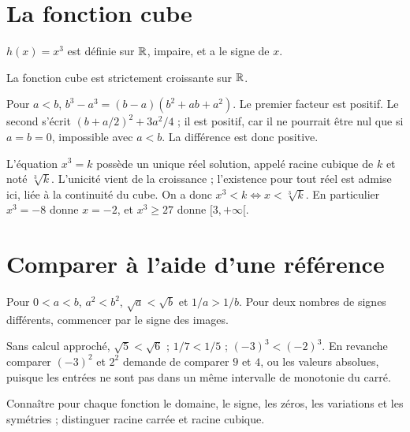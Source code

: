 \documentclass[../cours_2de.tex]{subfiles}
\begin{document}
\section{La fonction cube}
$h(x)=x^3$ est définie sur $\mathbb{R}$, impaire, et a le signe de $x$.
\begin{theoreme}
La fonction cube est strictement croissante sur $\mathbb{R}$.
\end{theoreme}
\begin{demonstration}
Pour $a<b$,
$b^3-a^3=(b-a)(b^2+ab+a^2)$.
Le premier facteur est positif. Le second s'écrit
$(b+a/2)^2+3a^2/4$ ; il est positif, car il ne pourrait être nul que si $a=b=0$, impossible avec $a<b$.
La différence est donc positive.
\end{demonstration}
L'équation $x^3=k$ possède un unique réel solution, appelé racine cubique de $k$ et noté $\sqrt[3]{k}$.
L'unicité vient de la croissance ; l'existence pour tout réel est admise ici, liée à la continuité du cube.
On a donc $x^3<k\Leftrightarrow x<\sqrt[3]{k}$.
En particulier $x^3=-8$ donne $x=-2$, et $x^3\geq27$ donne $[3,+\infty[$.
\begin{center}
\end{center}
\section{Comparer à l'aide d'une référence}
Pour $0<a<b$, $a^2<b^2$, $\sqrt a<\sqrt b$ et $1/a>1/b$.
Pour deux nombres de signes différents, commencer par le signe des images.
\begin{exemple}
Sans calcul approché, $\sqrt{5}<\sqrt{6}$ ; $1/7<1/5$ ; $(-3)^3<(-2)^3$.
En revanche comparer $(-3)^2$ et $2^2$ demande de comparer $9$ et $4$, ou les valeurs absolues, puisque les entrées ne sont pas dans un même intervalle de monotonie du carré.
\end{exemple}
\begin{retenir}
Connaître pour chaque fonction le domaine, le signe, les zéros, les variations et les symétries ; distinguer racine carrée et racine cubique.
\end{retenir}
\end{document}
